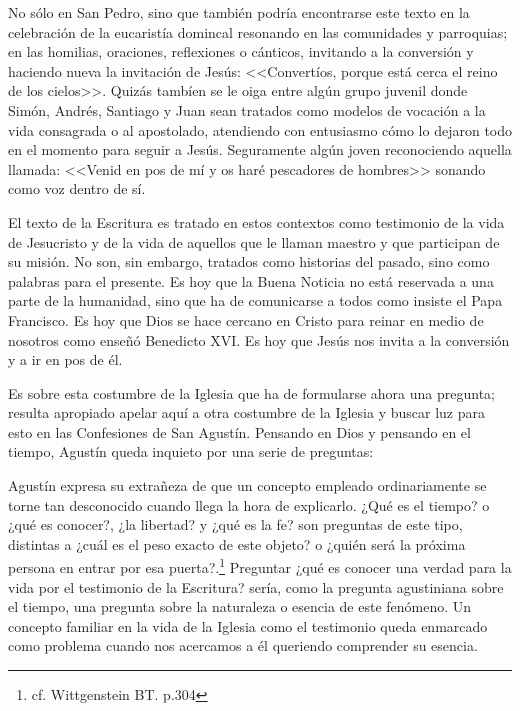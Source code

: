   No sólo en San Pedro, sino que también podría encontrarse este texto en la
  celebración de la eucaristía domincal resonando en las comunidades y parroquias;
  en las homilias, oraciones, reflexiones o cánticos, invitando a la conversión y
  haciendo nueva la invitación de Jesús: <<Convertíos, porque está cerca el reino
  de los cielos>>. Quizás tambíen se le oiga entre algún grupo juvenil donde
  Simón, Andrés, Santiago y Juan sean tratados como modelos de vocación a la vida
  consagrada o al apostolado, atendiendo con entusiasmo cómo lo dejaron todo en el
  momento para seguir a Jesús. Seguramente algún joven reconociendo aquella
  llamada: <<Venid en pos de mí y os haré pescadores de hombres>> sonando como voz
  dentro de sí.

  El texto de la Escritura es tratado en estos contextos como testimonio de la
  vida de Jesucristo y de la vida de aquellos que le llaman maestro y que
  participan de su misión. No son, sin embargo, tratados como historias del
  pasado, sino como palabras para el presente. Es hoy que la Buena Noticia no está
  reservada a una parte de la humanidad, sino que ha de comunicarse a todos como
  insiste el Papa Francisco. Es hoy que Dios se hace cercano en Cristo para reinar
  en medio de nosotros como enseñó Benedicto XVI. Es hoy que Jesús nos invita a la
  conversión y a ir en pos de él.

  Es sobre esta costumbre de la Iglesia que ha de formularse ahora una pregunta;
  resulta apropiado apelar aquí a otra costumbre de la Iglesia y buscar luz para
  esto en las Confesiones de San Agustín. Pensando en Dios y pensando en el
  tiempo, Agustín queda inquieto por una serie de preguntas: 

  Agustín expresa su extrañeza de que un concepto empleado ordinariamente se torne
  tan desconocido cuando llega la hora de explicarlo. ¿Qué es el tiempo? o ¿qué es
  conocer?, ¿la libertad? y ¿qué es la fe? son preguntas de este tipo, distintas a
  ¿cuál es el peso exacto de este objeto? o ¿quién será la próxima persona en
  entrar por esa puerta?.\footnote{cf. Wittgenstein BT. p.304} Preguntar ¿qué es
  conocer una verdad para la vida por el testimonio de la Escritura? sería, como
  la pregunta agustiniana sobre el tiempo, una pregunta sobre la naturaleza o
  esencia de este fenómeno. Un concepto familiar en la vida de la Iglesia como el
  testimonio queda enmarcado como problema cuando nos acercamos a él queriendo
  comprender su esencia.


